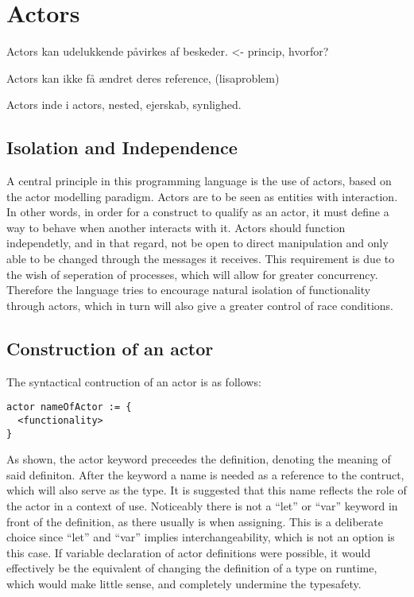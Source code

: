 \section{Actors}

Actors kan udelukkende påvirkes af beskeder. <- princip, hvorfor?

Actors kan ikke få ændret deres reference, (lisaproblem)

Actors inde i actors, nested, ejerskab, synlighed.



\subsection{Isolation and Independence}

A central principle in this programming language is the use of actors, based on the actor modelling paradigm. Actors are to be seen as entities with interaction. In other words, in order for a construct to qualify as an actor, it must define a way to behave when another interacts with it. Actors should function independetly, and in that regard, not be open to direct manipulation and only able to be changed through the messages it receives. This requirement is due to the wish of seperation of processes, which will allow for greater concurrency. Therefore the language tries to encourage natural isolation of functionality through actors, which in turn will also give a greater control of race conditions.

\subsection{Construction of an actor}

The syntactical contruction of an actor is as follows:

\begin{lstlisting}
actor nameOfActor := {
  <functionality>
}
\end{lstlisting}

As shown, the actor keyword preceedes the definition, denoting the meaning of said definiton. After the keyword a name is needed as a reference to the contruct, which will also serve as the type. It is suggested that this name reflects the role of the actor in a context of use. Noticeably there is not a \enquote{let} or \enquote{var} keyword in front of the definition, as there usually is when assigning. This is a deliberate choice since \enquote{let} and \enquote{var} implies interchangeability, which is not an option is this case. If variable declaration of actor definitions were possible, it would effectively be the equivalent of changing the definition of a type on runtime, which would make little sense, and completely undermine the typesafety.




